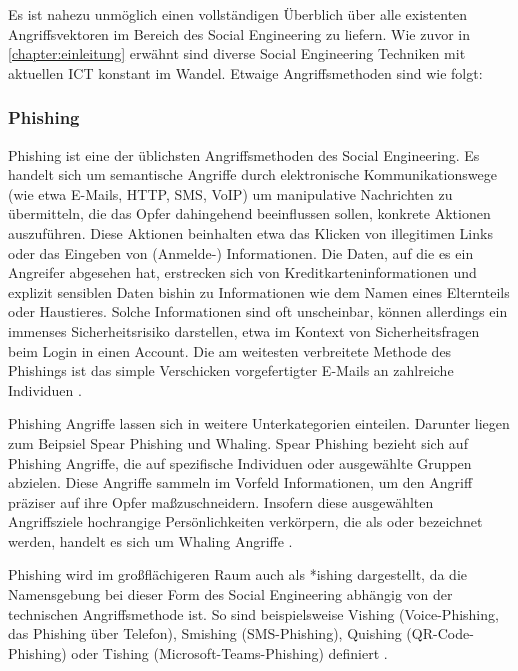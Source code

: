 Es ist nahezu unmöglich einen vollständigen Überblich über alle existenten Angriffsvektoren im Bereich des Social Engineering
zu liefern. Wie zuvor in \autoref{chapter:einleitung} erwähnt sind diverse Social Engineering Techniken mit aktuellen ICT konstant im Wandel.
Etwaige Angriffsmethoden sind wie folgt:

\subsubsection{Phishing}
\label{phishing}
Phishing ist eine der üblichsten Angriffsmethoden des Social Engineering. Es handelt sich um semantische Angriffe durch elektronische
Kommunikationswege (wie etwa E-Mails, HTTP, SMS, VoIP) um manipulative Nachrichten zu übermitteln, die das Opfer dahingehend beeinflussen
sollen, konkrete Aktionen auszuführen. Diese Aktionen beinhalten etwa das Klicken von illegitimen Links oder das Eingeben von (Anmelde-) Informationen.
Die Daten, auf die es ein Angreifer abgesehen hat, erstrecken sich von Kreditkarteninformationen und explizit sensiblen Daten bishin zu Informationen
wie dem Namen eines Elternteils oder Haustieres. Solche Informationen sind oft unscheinbar, können allerdings ein immenses Sicherheitsrisiko
darstellen, etwa im Kontext von Sicherheitsfragen beim Login in einen Account. Die am weitesten verbreitete Methode des Phishings ist das
simple Verschicken vorgefertigter E-Mails an zahlreiche Individuen .

Phishing Angriffe lassen sich in weitere Unterkategorien einteilen. Darunter liegen zum Beipsiel Spear Phishing und Whaling.
Spear Phishing bezieht sich auf Phishing Angriffe, die auf spezifische Individuen oder ausgewählte Gruppen abzielen.
Diese Angriffe sammeln im Vorfeld Informationen, um den Angriff präziser auf ihre Opfer maßzuschneidern. Insofern diese ausgewählten Angriffsziele
hochrangige Persönlichkeiten verkörpern, die als  oder  bezeichnet werden, handelt es sich um Whaling Angriffe .

Phishing wird im großflächigeren Raum auch als *ishing dargestellt, da die Namensgebung bei dieser Form des Social Engineering abhängig von der
technischen Angriffsmethode ist. So sind beispielsweise Vishing (Voice-Phishing, das Phishing über Telefon), Smishing (SMS-Phishing),
Quishing (QR-Code-Phishing) oder Tishing (Microsoft-Teams-Phishing) definiert .

